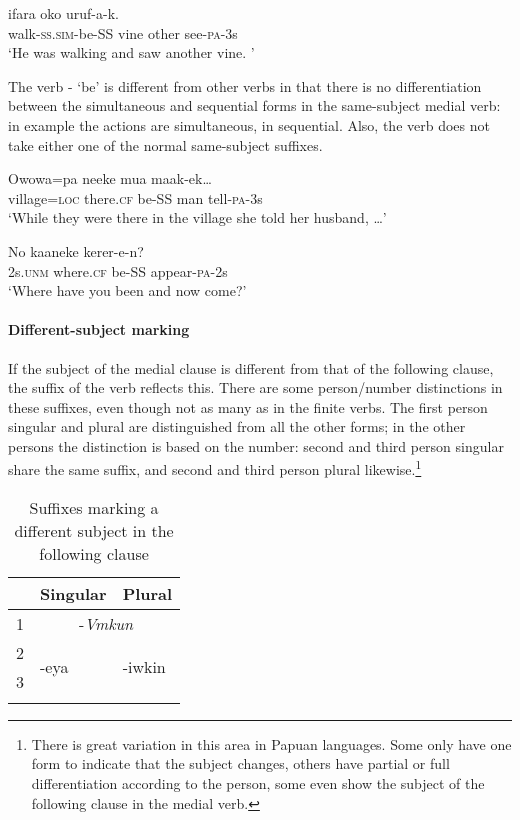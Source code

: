 \ea%
\label{ex:3:x241}
\gll {} ifara oko uruf-a-k. \\
walk-\textsc{ss}.\textsc{sim}-be-SS vine other see-\textsc{pa}-3s \\
\glt`He was walking and saw another vine. '
\z

The verb - `be' is different from other verbs in that there is no differentiation between the simultaneous and sequential forms in the same-subject medial verb: in example  the actions are simultaneous, in  sequential. Also, the verb does not take either one of the normal same-subject suffixes.

\ea%
\label{ex:3:x242}
\gll Owowa=pa neeke  mua maak-ek{\dots} \\
village=\textsc{loc} there.\textsc{cf} be-SS man tell-\textsc{pa}-3s \\
\glt`While they were there in the village she told her husband, {\dots}'
\z

\ea%
\label{ex:3:x243}
\gll No kaaneke  kerer-e-n? \\
2s.\textsc{unm} where.\textsc{cf} be-SS appear-\textsc{pa}-2s \\
\glt`Where have you been and now come?' 
\z

\paragraph{Different-subject marking}\label{sec:3.8.3.5.2}
{}
If the subject of the medial clause is different from that of the following clause, the suffix of the  verb reflects this. There are some person/number distinctions in these suffixes, even though not as many as in the finite verbs. The first person singular and plural are distinguished from all the other forms; in the other persons the distinction is based on the number: second and third person singular share the same suffix, and second and third person plural likewise.\footnote{There is great variation in this area in Papuan languages. Some only have one form to indicate that the subject changes, others have partial or full differentiation according to the person, some even show the subject of the following clause in the medial verb.} 


\begin{table}\begin{tabular}{lll}
\mytoprule
 & Singular & Plural\\
\midrule 
1 & \multicolumn{2}{c}{-\textit{Vmkun}}\\
2 & \multirow{2}{*}{-eya} & \multirow{2}{*}{-iwkin}\\
3 & & \\ 
\mybottomrule 
\end{tabular}
\caption{Suffixes marking a different subject in the following clause}
\label{tab:14}
\end{table}

